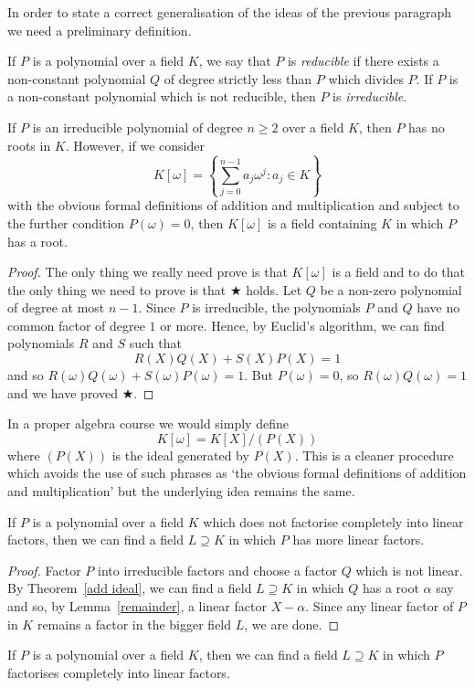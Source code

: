 In order to state a correct generalisation of the
ideas of the previous paragraph we need a preliminary
definition.
\begin{definition} If $P$ is a polynomial over a field $K$,
we say that $P$ is \emph{reducible} if there exists
a non-constant polynomial $Q$ of degree strictly
less than $P$ which divides $P$. If $P$ is a
non-constant polynomial which is not
reducible, then $P$ is \emph{irreducible}.
\end{definition}
\begin{theorem}\label{add ideal} If $P$ is an irreducible
polynomial of degree $n\geq 2$ over a field $K$,
then $P$ has
no roots in $K$. However, if we consider
\[K[\omega]=
\left\{\sum_{j=0}^{n-1}a_{j}\omega^{j}:
a_{j}\in K\right\}\]
with the
obvious formal definitions of addition and multiplication
and subject to the further
condition $P(\omega)=0$, then
$K[\omega]$ is a field containing $K$
in which $P$ has a root.
\end{theorem}
\begin{proof}  The only thing we really
need prove is that
$K[\omega]$ is a field and to
do that the only thing we need to prove is that
$\bigstar$ holds. Let $Q$ be a non-zero
polynomial of
degree at most $n-1$.
Since $P$ is irreducible,
the polynomials $P$ and $Q$ have no common
factor of degree $1$ or more. Hence, by
Euclid's algorithm, we can find polynomials
$R$ and $S$ such that
\[R(X)Q(X)+S(X)P(X)=1\]
and so $R(\omega)Q(\omega)+S(\omega)P(\omega)=1$.
But $P(\omega)=0$, so $R(\omega)Q(\omega)=1$
and we have proved $\bigstar$.
\end{proof}
In a proper algebra course we would simply define
\[K[\omega]=K[X]/(P(X))\]
where $(P(X))$ is the ideal generated by $P(X)$.
This is a cleaner procedure which avoids the
use of such phrases as `the
obvious formal definitions of addition and multiplication'
but the underlying idea remains the same.
\begin{lemma} If $P$ is a polynomial over a field $K$
which does not factorise completely into linear
factors, then we can find a field $L\supseteq K$
in which $P$ has more linear factors.
\end{lemma}
\begin{proof} Factor $P$ into irreducible factors
and choose a factor $Q$ which is not linear.
By Theorem~\ref{add ideal}, we can find a field $L\supseteq K$
in which $Q$ has a root $\alpha$ say
and so, by Lemma~\ref{remainder},
a linear factor $X-\alpha$. Since any linear factor of
$P$ in $K$ remains a factor in the bigger field $L$,
we are done.
\end{proof}
\begin{theorem}\label{splits one}
If $P$ is a polynomial over a field $K$,
then we can find a field $L\supseteq K$
in which $P$ factorises completely
into linear factors.
\end{theorem}

